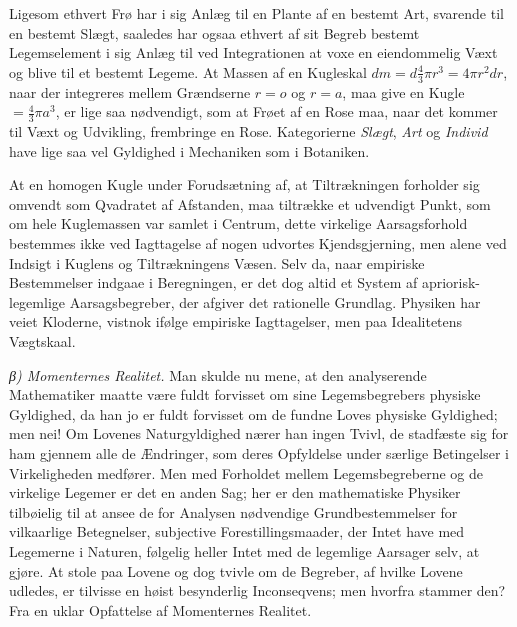 \documentclass[12pt,a4paper]{book}
\newcommand{\subrunin}[1]{\emph{#1}\hspace{0.4em}}
\begin{document}
Ligesom ethvert Frø har i sig Anlæg til en Plante af en bestemt Art,
svarende til en bestemt Slægt, saaledes har
ogsaa ethvert af sit Begreb bestemt Legemselement i sig Anlæg til ved
Integrationen at voxe en eiendommelig Væxt og blive til et bestemt
Legeme.
At Massen af en Kugleskal $dm = d\tfrac{4}{3}\pi r^{3} =
4\pi r^{2} dr$, naar der integreres mellem Grændserne $r = o$ og $r =
a$, maa give en Kugle $= \tfrac{4}{3}\pi a^{3}$, er lige saa
nødvendigt, som at Frøet af en Rose maa, naar det kommer til Væxt og
Udvikling, frembringe en Rose. Kategorierne \emph{Slægt}, \emph{Art}
og \emph{Individ} have lige saa vel Gyldighed i Mechaniken som i
Botaniken.

At en homogen Kugle under Forudsætning af, at Tiltrækningen forholder
sig omvendt som Qvadratet af Afstanden, maa tiltrække et udvendigt
Punkt, som om hele Kuglemassen var samlet i Centrum, dette virkelige
Aarsagsforhold bestemmes ikke ved Iagttagelse af nogen udvortes
Kjendsgjerning, men alene ved Indsigt i Kuglens og Tiltrækningens
Væsen.
Selv da, naar empiriske Bestemmelser indgaae i Beregningen, er det dog
altid et System af apriorisk-legemlige Aarsagsbegreber, der afgiver det
rationelle Grundlag. Physiken har veiet Kloderne, vistnok ifølge
empiriske Iagttagelser, men paa Idealitetens Vægtskaal.

\subrunin{β) Momenternes Realitet.} Man skulde nu mene, at den
analyserende Mathematiker maatte være fuldt forvisset om sine
Legemsbegrebers physiske Gyldighed, da han jo er fuldt forvisset om de
fundne Loves physiske Gyldighed; men nei! Om Lovenes Naturgyldighed
nærer han ingen Tvivl, de stadfæste sig for ham gjennem alle de
Ændringer, som deres Opfyldelse under særlige Betingelser i
Virkeligheden medfører. Men med Forholdet mellem Legemsbegreberne og
de virkelige Legemer er det en anden Sag; her er den mathematiske
Physiker tilbøielig til at ansee de for Analysen nødvendige
Grundbestemmelser for vilkaarlige Betegnelser, subjective
Forestillingsmaader, der Intet have med Legemerne i Naturen,
følgelig heller Intet med de legemlige Aarsager selv, at gjøre. At
stole paa Lovene og dog tvivle om de Begreber, af hvilke Lovene
udledes, er tilvisse en høist besynderlig Inconseqvens; men hvorfra
stammer den? Fra en uklar Opfattelse af Momenternes Realitet.
\end{document}
